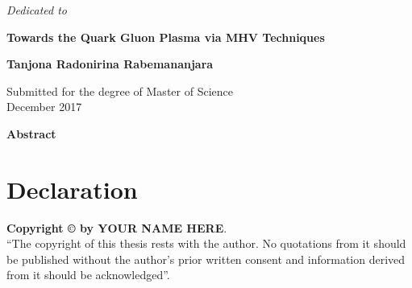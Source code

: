 \newpage
\thispagestyle{empty}
\begin{center}
 \vspace*{2cm}
  \textit{\LARGE {Dedicated to}}\\ 
\end{center}


\newpage
\thispagestyle{empty}
\begin{center}
  \textbf{\Large Towards the Quark Gluon Plasma via MHV Techniques}

  \vspace*{1cm}
  \textbf{\large Tanjona Radonirina Rabemananjara}

  \vspace*{0.5cm}
  {\large Submitted for the degree of Master of Science\\ December 2017}

  \vspace*{1cm}
  \textbf{\large Abstract}
\end{center}


\chapter*{Declaration}




\vspace{2in}
\noindent \textbf{Copyright \copyright{} by YOUR NAME HERE}.\\
``The copyright of this thesis rests with the author.  No quotations
from it should be published without the author's prior written consent
and information derived from it should be acknowledged''.




